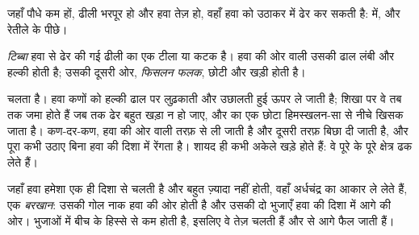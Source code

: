 जहाँ पौधे कम हों, ढीली  भरपूर हो और हवा तेज़ हो, वहाँ हवा  को उठाकर  में ढेर
कर सकती है:  में, और रेतीले  के पीछे।

\begin{definition}[टिब्बा]\label{def:g9:landforms:dune}
\emph{टिब्बा} हवा से ढेर की गई ढीली  का एक टीला या कटक है। हवा की ओर
वाली उसकी ढाल लंबी और हल्की होती है; उसकी दूसरी ओर, \emph{फिसलन फलक},
छोटी और खड़ी होती है।
\end{definition}

 चलता है। हवा कणों को हल्की ढाल पर लुढ़काती और उछालती हुई ऊपर ले जाती है; शिखा पर वे
तब तक जमा होते हैं जब तक ढेर बहुत खड़ा न हो जाए, और  का एक छोटा हिमस्खलन-सा  से नीचे खिसक जाता है। कण-दर-कण,  हवा की ओर वाली तरफ़ से ली जाती है और दूसरी
तरफ़ बिछा दी जाती है, और पूरा  कभी उठाए बिना हवा की दिशा में रेंगता है।  शायद ही
कभी अकेले खड़े होते हैं: वे पूरे के पूरे क्षेत्र ढक लेते
हैं।

जहाँ हवा हमेशा एक ही दिशा से चलती है और  बहुत ज़्यादा नहीं होती, वहाँ  अर्धचंद्र का
आकार ले लेते हैं, एक \emph{बरखान}: उसकी गोल नाक हवा की ओर होती है और उसकी दो भुजाएँ हवा
की दिशा में आगे की ओर। भुजाओं में बीच के हिस्से से कम  होती है, इसलिए वे तेज़ चलती हैं
और  से आगे फैल जाती हैं।

